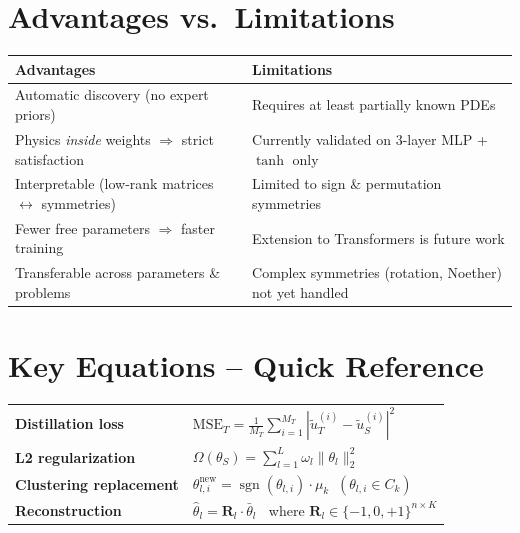 \documentclass[11pt,a4paper]{article}
\newcommand{\R}{\mathbf{R}}
\begin{document}
\section{Advantages vs.\ Limitations}

\begin{center}
\renewcommand{\arraystretch}{1.3}
\begin{tabular}{@{}p{6.5cm} p{6.5cm}@{}}
\toprule
\textbf{Advantages} & \textbf{Limitations} \\
\midrule
Automatic discovery (no expert priors) & Requires at least partially known PDEs \\
Physics \textit{inside} weights $\Rightarrow$ strict satisfaction & Currently validated on 3-layer MLP + $\tanh$ only \\
Interpretable (low-rank matrices $\leftrightarrow$ symmetries) & Limited to sign \& permutation symmetries \\
Fewer free parameters $\Rightarrow$ faster training & Extension to Transformers is future work \\
Transferable across parameters \& problems & Complex symmetries (rotation, Noether) not yet handled \\
\bottomrule
\end{tabular}
\end{center}

\section{Key Equations -- Quick Reference}

\begin{tcolorbox}[colback=blue!3,colframe=blue!40!black]
\renewcommand{\arraystretch}{1.8}
\begin{tabular}{@{}l l@{}}
\textbf{Distillation loss} & $\displaystyle\text{MSE}_T = \frac{1}{M_T}\sum_{i=1}^{M_T}|\tilde{u}_T^{(i)}-\tilde{u}_S^{(i)}|^2$ \\
\textbf{L2 regularization} & $\displaystyle\Omega(\theta_S) = \sum_{l=1}^{L}\omega_l\|\theta_l\|_2^2$ \\
\textbf{Clustering replacement} & $\theta_{l,i}^{\text{new}} = \operatorname{sgn}(\theta_{l,i})\cdot\mu_k \;\;(\theta_{l,i}\in C_k)$ \\
\textbf{Reconstruction} & $\hat{\theta}_l = \R_l\cdot\bar{\theta}_l \;\;$ where $\R_l\in\{-1,0,+1\}^{n\times K}$ \\
\end{tabular}
\end{tcolorbox}
\end{document}
